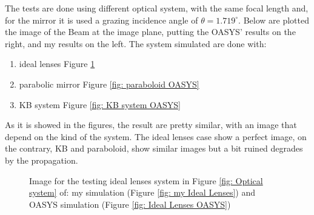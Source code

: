 %
The tests are done using different optical system, with the same focal length and, for the mirror it is used a grazing incidence angle of $\theta = 1.719^{\circ}$. Below are plotted the image of the Beam at the image plane, putting the OASYS' results on the right, and my results on the left. The system simulated are done with:
\begin{enumerate}
\item ideal lenses Figure \ref{fig: Ideal lense OASYS}
\item parabolic mirror Figure \ref{fig: paraboloid OASYS}
\item KB system Figure \ref{fig: KB system OASYS}
\end{enumerate} 
\noindent As it is showed in the figures, the result are pretty similar, with an image that depend on the kind of the system. The ideal lenses case show a perfect image, on the contrary, KB and paraboloid, show similar  images but a bit ruined degrades by the propagation.
\newpage
%
\begin{figure}[H]
%
\centering
%
%
%
\caption{Image for the testing ideal lenses system in Figure \ref{fig: Optical system} of: my simulation (Figure \ref{fig: my Ideal Lenses}) and OASYS simulation (Figure \ref{fig: Ideal Lenses OASYS})}
%
\label{fig: Ideal lense OASYS}
%
\end{figure}
%
